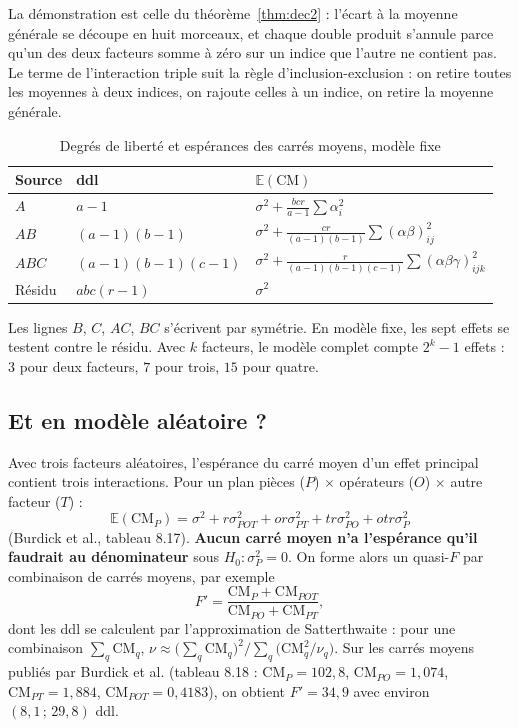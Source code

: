 \documentclass[11pt,a4paper]{article}
\theoremstyle{sj}
\theoremstyle{definition}
\theoremstyle{remark}
\newcommand{\E}{\mathbb{E}}
\newcommand{\CM}{\mathrm{CM}}
\begin{document}
La démonstration est celle du théorème~\ref{thm:dec2} : l'écart à la moyenne générale se découpe en huit morceaux, et chaque double produit s'annule parce qu'un des deux facteurs somme à zéro sur un indice que l'autre ne contient pas. Le terme de l'interaction triple suit la règle d'inclusion-exclusion : on retire toutes les moyennes à deux indices, on rajoute celles à un indice, on retire la moyenne générale.

\begin{table}[h]
\centering
\caption{Degrés de liberté et espérances des carrés moyens, modèle fixe}
\begin{tabular}{l l l}
\toprule
Source & ddl & $\E(\CM)$\\
\midrule
$A$ & $a-1$ & $\sigma^2+\frac{bcr}{a-1}\sum\alpha_i^2$\\
$AB$ & $(a-1)(b-1)$ & $\sigma^2+\frac{cr}{(a-1)(b-1)}\sum(\alpha\beta)_{ij}^2$\\
$ABC$ & $(a-1)(b-1)(c-1)$ & $\sigma^2+\frac{r}{(a-1)(b-1)(c-1)}\sum(\alpha\beta\gamma)_{ijk}^2$\\
Résidu & $abc(r-1)$ & $\sigma^2$\\
\bottomrule
\end{tabular}
\end{table}

Les lignes $B$, $C$, $AC$, $BC$ s'écrivent par symétrie. En modèle fixe, les sept effets se testent contre le résidu. Avec $k$ facteurs, le modèle complet compte $2^k-1$ effets : $3$ pour deux facteurs, $7$ pour trois, $15$ pour quatre.

\subsection{Et en modèle aléatoire ?}

Avec trois facteurs aléatoires, l'espérance du carré moyen d'un effet principal contient trois interactions. Pour un plan pièces ($P$) $\times$ opérateurs ($O$) $\times$ autre facteur ($T$) :
\[
\E(\CM_P)=\sigma^2+r\sigma_{POT}^2+or\sigma_{PT}^2+tr\sigma_{PO}^2+otr\sigma_P^2
\]
(Burdick et al., tableau 8.17). \textbf{Aucun carré moyen n'a l'espérance qu'il faudrait au dénominateur} sous $H_0:\sigma_P^2=0$. On forme alors un quasi-$F$ par combinaison de carrés moyens, par exemple
\[
F'=\frac{\CM_P+\CM_{POT}}{\CM_{PO}+\CM_{PT}},
\]
dont les ddl se calculent par l'approximation de Satterthwaite : pour une combinaison $\sum_q\CM_q$, $\nu\approx\big(\sum_q\CM_q\big)^2\big/\sum_q\big(\CM_q^2/\nu_q\big)$. Sur les carrés moyens publiés par Burdick et al. (tableau 8.18 : $\CM_P=102{,}8$, $\CM_{PO}=1{,}074$, $\CM_{PT}=1{,}884$, $\CM_{POT}=0{,}4183$), on obtient $F'=34{,}9$ avec environ $(8{,}1\,;\,29{,}8)$ ddl.
\end{document}
